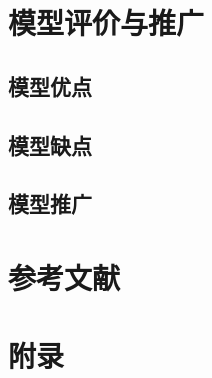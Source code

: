 \documentclass[12pt,a4paper]{ctexart}
\numberwithin{figure}{section}
\numberwithin{table}{section}
\numberwithin{equation}{section}
\begin{document}
{{{{\section{模型评价与推广}

\subsection{模型优点}

\subsection{模型缺点}

\subsection{模型推广}

\section{参考文献}


\section{附录}

}}}}
\end{document}
